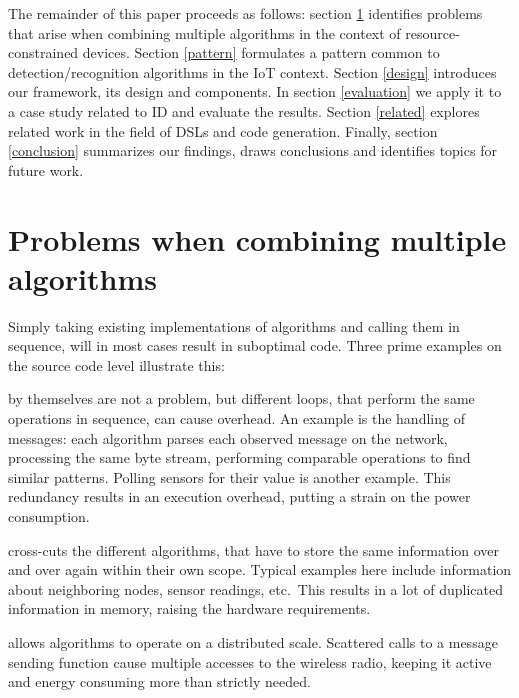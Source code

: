 \documentclass[3p,times,procedia]{elsarticle}
\begin{document}

The remainder of this paper proceeds as follows: section \ref{problems}
identifies problems that arise when combining multiple algorithms in the
context of resource-constrained devices. Section \ref{pattern} formulates a
pattern common to detection/recognition algorithms in the IoT context. Section
\ref{design} introduces our framework, its design and components. In section
\ref{evaluation} we apply it to a case study related to ID and evaluate the
results. Section \ref{related} explores related work in the field of DSLs and
code generation. Finally, section \ref{conclusion} summarizes our findings,
draws conclusions and identifies topics for future work.

\section{Problems when combining multiple algorithms}
\label{problems}

Simply taking existing implementations of algorithms and calling them in
sequence, will in most cases result in suboptimal code. Three prime examples on
the source code level illustrate this:

\begin{description}[style=unboxed,leftmargin=0cm]

  \item[Loops] by themselves are not a problem, but different loops, that
  perform the same operations in sequence, can cause overhead. An example is
  the handling of messages: each algorithm parses each observed message on the
  network, processing the same byte stream, performing comparable operations to
  find similar patterns. Polling sensors for their value is another example.
  This redundancy results in an execution overhead, putting a strain on the
  power consumption.

  \item[Common data] cross-cuts the different algorithms, that have to store
  the same information over and over again within their own scope. Typical
  examples here include information about neighboring nodes, sensor readings,
  etc.\ This results in a lot of duplicated information in memory, raising the
  hardware requirements.

  \item[The network] allows algorithms to operate on a distributed scale.
  Scattered calls to a message sending function cause multiple accesses to the
  wireless radio, keeping it active and energy consuming more than strictly
  needed.

\end{description}
\end{document}
